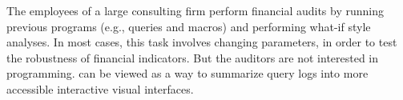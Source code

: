  The employees of a large consulting firm perform financial audits by running previous programs (e.g., queries and macros) and performing what-if style analyses. In most cases, this task involves changing parameters, in order to test the robustness of financial indicators. But the auditors are not interested in programming.  \sys can be viewed as a way to summarize query logs into more accessible interactive visual interfaces.




\smallskip

